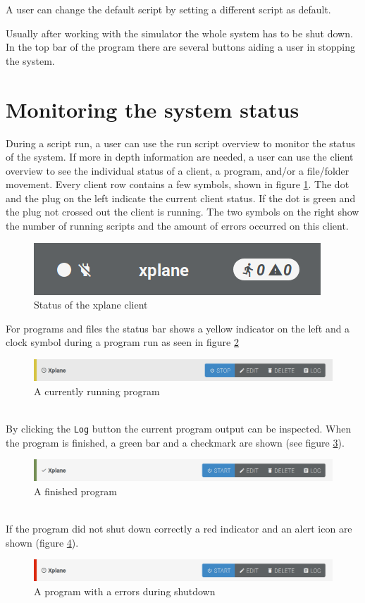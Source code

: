 \documentclass[accentcolor=tud1a, paper=a4, colorback]{tudreport}
\begin{document}
	A user can change the default script by setting a different script as default.

	Usually after working with the simulator the whole system has to be shut down. In the top
	bar of the program there are several buttons aiding a user in stopping the system.

	\section{Monitoring the system status}
	During a script run, a user can use the run script overview to monitor the status of the
	system. If more in depth information are needed, a user can use the client overview to
	see the individual status of a client, a program, and/or a file/folder movement.
	Every client row contains a few symbols, shown in figure \ref{client_status}.
	The dot and the plug on the left indicate the current client status. If the dot is
	green and the plug not crossed out the client is running. The two symbols on the right
	show the number of running scripts and the amount of errors occurred on this client.
	\begin{figure}[h]
		\centering
		\includegraphics[width=.3\textwidth]{client_status}
		\caption{Status of the xplane client}
		\label{client_status}
	\end{figure}
	For programs and files the status bar shows a yellow indicator on the left and a clock symbol
	during a program run as seen in figure \ref{running_program}
	\begin{figure}[h]
		\centering
		\includegraphics[width=.6\textwidth]{running_program}
		\caption{A currently running program}
		\label{running_program}
	\end{figure}\\
	By clicking the \texttt{Log} button the current program output can be inspected.
	When the program is finished, a green bar and a checkmark are shown (see figure \ref{finished_program}).
	\begin{figure}[h]
		\centering
		\includegraphics[width=.6\textwidth]{finished_program}
		\caption{A finished program}
		\label{finished_program}
	\end{figure}\\
	If the program did not shut down correctly a red indicator and an alert icon are shown (figure \ref{failed_program}).
	\begin{figure}[h]
		\centering
		\includegraphics[width=.6\textwidth]{failed_program}
		\caption{A program with a errors during shutdown}
		\label{failed_program}
	\end{figure}\\
\end{document}

